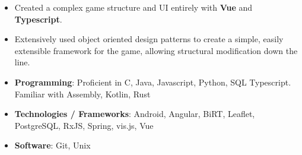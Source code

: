 \documentclass{article}
\begin{document}
\begin{itemize}
	\item Created a complex game structure and UI entirely with \textbf{Vue} and
	      \textbf{Typescript}.
	\item Extensively used object oriented design patterns to create a simple,
	      easily extensible framework for the game, allowing structural
	      modification down the line.
\end{itemize}

\vspace*{\fill}


\begin{itemize}
	\item \textbf{Programming}: Proficient in C, Java, Javascript, Python, SQL
	      Typescript. Familiar with Assembly, Kotlin, Rust
	\item \textbf{Technologies / Frameworks}: Android, Angular, BiRT, Leaflet,
	      PostgreSQL, RxJS, Spring, vis.js, Vue
	\item \textbf{Software}: Git, Unix
\end{itemize}
\end{document}
